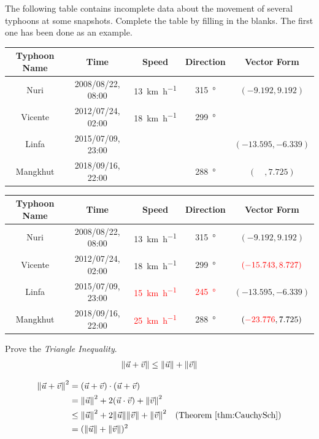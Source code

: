 \begin{Exercise}
The following table contains incomplete data about the movement of several typhoons at some snapshots. Complete the table by filling in the blanks. The first one has been done as an example.
\begin{center}
\footnotesize
\begin{tabular}{|c|c|c|c|c|}
\hline
Typhoon Name & Time & Speed & Direction & Vector Form\\
\hline
Nuri & 2008/08/22, 08:00 & \SI{13}{\km \per \hour} & \SI{315}{\degree} & $(-9.192, 9.192)$\\
\hline
Vicente & 2012/07/24, 02:00 & \SI{18}{\km \per \hour} & \SI{299}{\degree} & \\
\hline
Linfa & 2015/07/09, 23:00 & & & $(-13.595, -6.339)$\\
\hline
Mangkhut & 2018/09/16, 22:00 & & \SI{288}{\degree} & $(\quad, 7.725)$\\
\hline
\end{tabular}
\end{center}
\end{Exercise}
\begin{Answer}
\begin{center}
\footnotesize
\begin{tabular}{|c|c|c|c|c|}
\hline
Typhoon Name & Time & Speed & Direction & Vector Form\\
\hline
Nuri & 2008/08/22, 08:00 & \SI{13}{\km \per \hour} & \SI{315}{\degree} & $(-9.192, 9.192)$\\
\hline
Vicente & 2012/07/24, 02:00 & \SI{18}{\km \per \hour} & \SI{299}{\degree} & $\mathcolor{red}{(-15.743, 8.727)}$\\
\hline
Linfa & 2015/07/09, 23:00 & \textcolor{red}{\SI{15}{\km \per \hour}} & \textcolor{red}{\SI{245}{\degree}} & $(-13.595, -6.339)$\\
\hline
Mangkhut & 2018/09/16, 22:00 & \textcolor{red}{\SI{25}{\km \per \hour}} & \SI{288}{\degree} & $(\mathcolor{red}{-23.776}, 7.725)$\\
\hline
\end{tabular}
\end{center}    
\end{Answer}

\begin{Exercise}
\label{ex:triangular}
Prove the \textit{Triangle Inequality}.
\begin{align}
\norm{\vec{u} + \vec{v}} \leq \norm{\vec{u}} + \norm{\vec{v}}
\end{align}
\end{Exercise}
\begin{Answer}
\begin{align*}
\norm{\vec{u} + \vec{v}}^2 &= (\vec{u} + \vec{v}) \cdot (\vec{u} + \vec{v}) \\
&= \norm{\vec{u}}^2 + 2(\vec{u}\cdot\vec{v}) + \norm{\vec{v}}^2 \\
&\leq \norm{\vec{u}}^2 + 2\norm{\vec{u}}\norm{\vec{v}} + \norm{\vec{v}}^2 &\text{(Theorem \ref{thm:CauchySch})}\\
&= (\norm{\vec{u}} + \norm{\vec{v}})^2
\end{align*}
\end{Answer}

